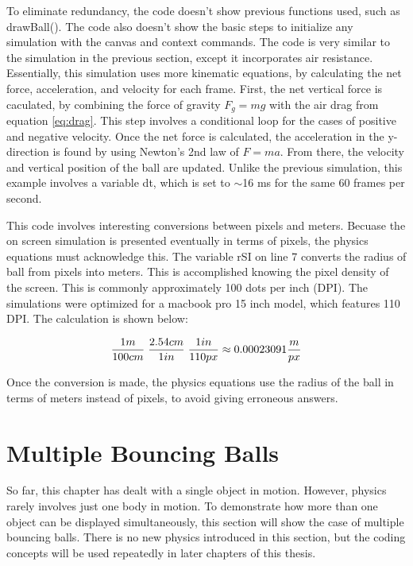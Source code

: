 To eliminate redundancy, the code doesn't show previous functions used, such as drawBall().  The code also doesn't show the basic steps to initialize any simulation with the canvas and context commands.  The code is very similar to the simulation in the previous section, except it incorporates air resistance.  Essentially, this simulation uses more kinematic equations, by calculating the net force, acceleration, and velocity for each frame.  First, the net vertical force is caculated, by combining the force of gravity $F_g = mg$ with the air drag from equation \ref{eq:drag}.  This step involves a conditional loop for the cases of positive and negative velocity.  Once the net force is calculated, the acceleration in the y-direction is found by using Newton's 2nd law of $F = ma$.  From there, the velocity and vertical position of the ball are updated.  Unlike the previous simulation, this example involves a variable dt, which is set to $\sim$16 ms for the same 60 frames per second.   


This code involves interesting conversions between pixels and meters.  Becuase the on screen simulation is presented eventually in terms of pixels, the physics equations must acknowledge this.  The variable rSI on line 7 converts the radius of ball from pixels into meters.  This is accomplished knowing the pixel density of the screen.  This is commonly approximately 100 dots per inch (DPI).  The simulations were optimized for a macbook pro 15 inch model, which features 110 DPI.  The calculation is shown below:

\begin{equation}\label{eq:pixels}
\frac{1m}{100 cm} \hspace{1mm} \frac{2.54 cm}{1 in}  \hspace{1mm}   \frac{1 in}{110 px} \approx  0.00023091 \frac{m}{px}
\end{equation}

Once the conversion is made, the physics equations use the radius of the ball in terms of meters instead of pixels, to avoid giving erroneous answers.

\section{Multiple Bouncing Balls}

So far, this chapter has dealt with a single object in motion.  However, physics rarely involves just one body in motion.  To demonstrate how more than one object can be displayed simultaneously, this section will show the case of multiple bouncing balls.  There is no new physics introduced in this section, but the coding concepts will be used repeatedly in later chapters of this thesis.

